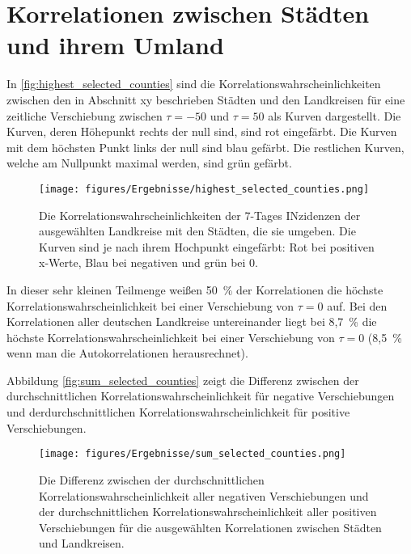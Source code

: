 \section{Korrelationen zwischen Städten und ihrem Umland}
In \autoref{fig:highest_selected_counties} sind die Korrelationswahrscheinlichkeiten zwischen den in Abschnitt xy beschrieben Städten und den Landkreisen für eine zeitliche Verschiebung zwischen $\tau=-50$ und $\tau=50$ als Kurven dargestellt.
Die Kurven, deren Höhepunkt rechts der null sind, sind rot eingefärbt. Die Kurven mit dem höchsten Punkt links der null sind blau gefärbt. Die restlichen Kurven, welche am Nullpunkt maximal werden, sind grün gefärbt.
\begin{figure}[H]
    \centering
    \texttt{[image: figures/Ergebnisse/highest\_selected\_counties.png]}
    \caption{Die Korrelationswahrscheinlichkeiten der 7-Tages INzidenzen der ausgewählten Landkreise mit den Städten, die sie umgeben. Die Kurven sind je nach ihrem Hochpunkt eingefärbt: Rot bei positiven x-Werte, Blau bei negativen und grün bei 0.}
    \label{fig:highest_selected_counties}
\end{figure}

In dieser sehr kleinen Teilmenge weißen 50~\% der Korrelationen die höchste Korrelationswahrscheinlichkeit bei einer Verschiebung von $\tau = 0$ auf.
Bei den Korrelationen aller deutschen Landkreise untereinander liegt bei 8,7~\% die höchste Korrelationswahrscheinlichkeit bei einer Verschiebung von $\tau= 0$ (8,5~\% wenn man die Autokorrelationen herausrechnet).

Abbildung \autoref{fig:sum_selected_counties} zeigt die Differenz zwischen der durchschnittlichen Korrelationswahrscheinlichkeit für negative Verschiebungen und derdurchschnittlichen Korrelationswahrscheinlichkeit für positive Verschiebungen.
\begin{figure}
    \centering
    \texttt{[image: figures/Ergebnisse/sum\_selected\_counties.png]}
    \caption{Die Differenz zwischen der durchschnittlichen Korrelationswahrscheinlichkeit aller negativen Verschiebungen und der durchschnittlichen Korrelationswahrscheinlichkeit aller positiven Verschiebungen für die ausgewählten Korrelationen zwischen Städten und Landkreisen.}
    \label{fig:sum_selected_counties}
\end{figure}
